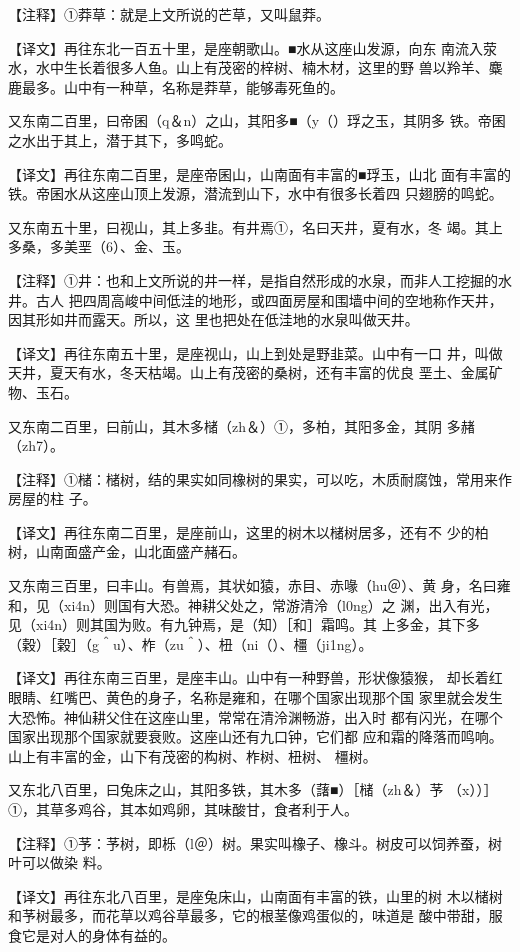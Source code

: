 \documentclass[a4paper,12pt,UTF8,twoside]{ctexbook}
\begin{document}
【注释】①莽草：就是上文所说的芒草，又叫鼠莽。

【译文】再往东北一百五十里，是座朝歌山。■水从这座山发源，向东 南流入荥水，水中生长着很多人鱼。山上有茂密的梓树、楠木材，这里的野 兽以羚羊、麋鹿最多。山中有一种草，名称是莽草，能够毒死鱼的。

又东南二百里，曰帝囷（q＆n）之山，其阳多■（y（）琈之玉，其阴多 铁。帝囷之水出于其上，潜于其下，多鸣蛇。

【译文】再往东南二百里，是座帝囷山，山南面有丰富的■琈玉，山北 面有丰富的铁。帝囷水从这座山顶上发源，潜流到山下，水中有很多长着四 只翅膀的鸣蛇。

又东南五十里，曰视山，其上多韭。有井焉①，名曰天井，夏有水，冬 竭。其上多桑，多美垩（6）、金、玉。

【注释】①井：也和上文所说的井一样，是指自然形成的水泉，而非人工挖掘的水井。古人 把四周高峻中间低洼的地形，或四面房屋和围墙中间的空地称作天井，因其形如井而露天。所以，这 里也把处在低洼地的水泉叫做天井。

【译文】再往东南五十里，是座视山，山上到处是野韭菜。山中有一口 井，叫做天井，夏天有水，冬天枯竭。山上有茂密的桑树，还有丰富的优良 垩土、金属矿物、玉石。

又东南二百里，曰前山，其木多槠（zh＆）①，多柏，其阳多金，其阴 多赭（zh7）。

【注释】①槠：槠树，结的果实如同橡树的果实，可以吃，木质耐腐蚀，常用来作房屋的柱 子。

【译文】再往东南二百里，是座前山，这里的树木以槠树居多，还有不 少的柏树，山南面盛产金，山北面盛产赭石。

又东南三百里，曰丰山。有兽焉，其状如猿，赤目、赤喙（hu＠）、黄 身，名曰雍和，见（xi4n）则国有大恐。神耕父处之，常游清泠（l0ng）之 渊，出入有光，见（xi4n）则其国为败。有九钟焉，是（知）［和］霜鸣。其 上多金，其下多（穀）［榖］（g＾u）、柞（zu＾）、杻（ni（）、橿（ji1ng）。

【译文】再往东南三百里，是座丰山。山中有一种野兽，形状像猿猴， 却长着红眼睛、红嘴巴、黄色的身子，名称是雍和，在哪个国家出现那个国 家里就会发生大恐怖。神仙耕父住在这座山里，常常在清泠渊畅游，出入时 都有闪光，在哪个国家出现那个国家就要衰败。这座山还有九口钟，它们都 应和霜的降落而鸣响。山上有丰富的金，山下有茂密的构树、柞树、杻树、 橿树。

又东北八百里，曰兔床之山，其阳多铁，其木多（藷■）［槠（zh＆）芧 （x））］①，其草多鸡谷，其本如鸡卵，其味酸甘，食者利于人。

【注释】①芧：芧树，即栎（l＠）树。果实叫橡子、橡斗。树皮可以饲养蚕，树叶可以做染 料。

【译文】再往东北八百里，是座兔床山，山南面有丰富的铁，山里的树 木以槠树和芧树最多，而花草以鸡谷草最多，它的根茎像鸡蛋似的，味道是 酸中带甜，服食它是对人的身体有益的。
\end{document}
